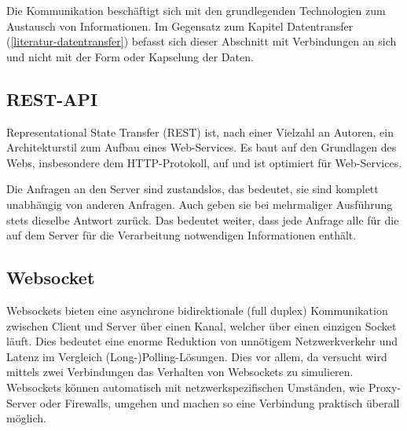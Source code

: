 
Die Kommunikation beschäftigt sich mit den grundlegenden Technologien zum Austausch von Informationen. Im Gegensatz zum Kapitel Datentransfer (\autoref{literatur-datentransfer}) befasst sich dieser Abschnitt mit Verbindungen an sich und nicht mit der Form oder Kapselung der Daten.



\subsection{REST-API}


Representational State Transfer (REST) ist, nach einer Vielzahl an Autoren, ein Architekturstil zum Aufbau eines Web-Services. Es baut auf den Grundlagen des Webs, insbesondere dem HTTP-Protokoll, auf und ist optimiert für Web-Services. 


Die Anfragen an den Server sind zustandslos, das bedeutet, sie sind komplett unabhängig von anderen Anfragen. Auch geben sie bei mehrmaliger Ausführung stets dieselbe Antwort zurück. Das bedeutet weiter, dass jede Anfrage alle für die auf dem Server für die Verarbeitung notwendigen Informationen enthält.\\\cite{Fielding17:online, WebServi33:online, richardson2008restful}




\subsection{Websocket}


Websockets bieten eine asynchrone bidirektionale (full duplex) Kommunikation zwischen Client und Server über einen Kanal, welcher über einen einzigen Socket läuft. Dies bedeutet eine enorme Reduktion von unnötigem Netzwerkverkehr und Latenz im Vergleich (Long-)Polling-Lösungen. Dies vor allem, da versucht wird mittels zwei Verbindungen das Verhalten von Websockets zu simulieren. Websockets können automatisch mit netzwerkspezifischen Umständen, wie Proxy-Server oder Firewalls, umgehen und machen so eine Verbindung praktisch überall möglich.\\\cite{AboutHTM97:online, RFC6455T98:online}


